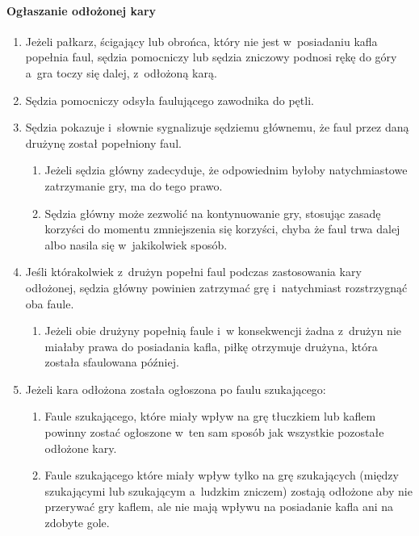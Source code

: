 \documentclass[12pt]{article}
\begin{document}
\paragraph{Ogłaszanie odłożonej kary}

\begin{enumerate}
	\item
	      Jeżeli pałkarz, ścigający lub obrońca, który nie jest w~posiadaniu
	      kafla popełnia faul, sędzia pomocniczy lub sędzia zniczowy podnosi
	      rękę do góry a~gra toczy się dalej, z~odłożoną karą.
	\item
	      Sędzia pomocniczy odsyła faulującego zawodnika do pętli.
	\item
	      Sędzia pokazuje i~słownie sygnalizuje sędziemu głównemu, że faul przez
	      daną drużynę został popełniony faul.

	      \begin{enumerate}
		      \item
		            Jeżeli sędzia główny zadecyduje, że odpowiednim byłoby
		            natychmiastowe zatrzymanie gry, ma do tego prawo.
		      \item
		            Sędzia główny może zezwolić na kontynuowanie gry, stosując zasadę
		            korzyści do momentu zmniejszenia się korzyści, chyba że faul trwa
		            dalej albo nasila się w~jakikolwiek sposób.
	      \end{enumerate}
	\item
	      Jeśli którakolwiek z~drużyn popełni faul podczas zastosowania kary
	      odłożonej, sędzia główny powinien zatrzymać grę i~natychmiast
	      rozstrzygnąć oba faule.

	      \begin{enumerate}
		      \item
		            Jeżeli obie drużyny popełnią faule i~w konsekwencji żadna z~drużyn
		            nie miałaby prawa do posiadania kafla, piłkę otrzymuje drużyna,
		            która została sfaulowana później.
	      \end{enumerate}
	\item
	      Jeżeli kara odłożona została ogłoszona po faulu szukającego:

	      \begin{enumerate}
		      \item
		            Faule szukającego, które miały wpływ na grę tłuczkiem lub kaflem
		            powinny zostać ogłoszone w~ten sam sposób jak wszystkie pozostałe
		            odłożone kary.
		      \item
		            Faule szukającego które miały wpływ tylko na grę szukających (między
		            szukającymi lub szukającym a~ludzkim zniczem) zostają odłożone aby
		            nie przerywać gry kaflem, ale nie mają wpływu na posiadanie kafla
		            ani na zdobyte gole.
	      \end{enumerate}
\end{enumerate}
\end{document}
